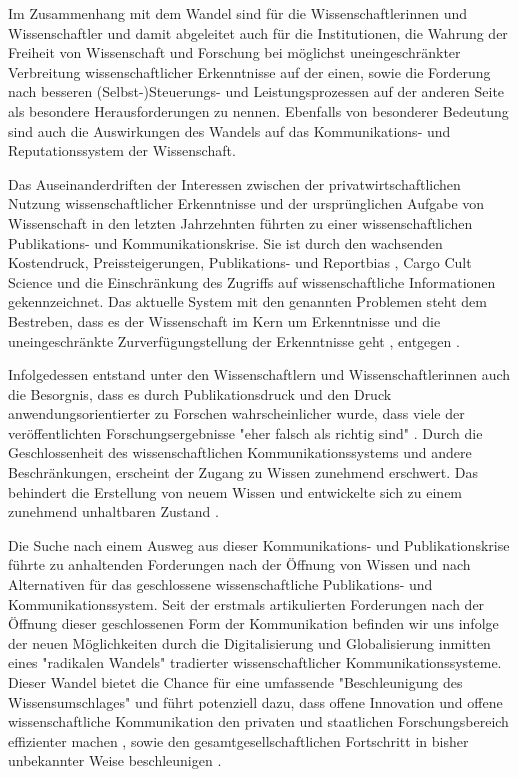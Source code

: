 Im Zusammenhang mit dem Wandel sind für die Wissenschaftlerinnen und Wissenschaftler und damit abgeleitet auch für die Institutionen, die Wahrung der Freiheit von Wissenschaft und Forschung bei möglichst uneingeschränkter Verbreitung wissenschaftlicher Erkenntnisse \cite{hagner_2015_sache_buches} \cite{bbaw_publizieren_2015} auf der einen, sowie die Forderung nach besseren (Selbst-)Steuerungs- und Leistungsprozessen \cite{Adler_2009} \cite{gibbons_1994} auf der anderen Seite als besondere Herausforderungen zu nennen. Ebenfalls von besonderer Bedeutung sind auch die Auswirkungen des Wandels auf das Kommunikations- und Reputationssystem der Wissenschaft.

Das Auseinanderdriften der Interessen zwischen der privatwirtschaftlichen Nutzung wissenschaftlicher Erkenntnisse und der ursprünglichen Aufgabe von Wissenschaft in den letzten Jahrzehnten führten zu einer wissenschaftlichen Publikations- und Kommunikationskrise. Sie ist durch den wachsenden Kostendruck, Preissteigerungen, Publikations- \cite{Egger_1997} \cite{Fanelli_2012} \cite{Beverungen_2012} \cite{Brembs_20013} und Reportbias \cite{Chan_2008} \cite{Dickersin_2011}, Cargo Cult Science \cite{Feynman_1974} und die Einschränkung des Zugriffs auf wissenschaftliche Informationen \cite{Hess_2006} gekennzeichnet. Das aktuelle System mit den genannten Problemen steht dem Bestreben, dass es der Wissenschaft im Kern um Erkenntnisse und die uneingeschränkte Zurverfügungstellung der Erkenntnisse geht \cite{hanekop_2006}, entgegen \cite{offhaus_2012_institutionelle_repos}.

Infolgedessen entstand unter den Wissenschaftlern und Wissenschaftlerinnen auch die Besorgnis, dass es durch Publikationsdruck und den Druck anwendungsorientierter zu Forschen wahrscheinlicher wurde, dass viele der veröffentlichten Forschungsergebnisse "eher falsch als richtig sind" \cite{Ioannidis_2005}. Durch die Geschlossenheit des wissenschaftlichen Kommunikationssystems und andere Beschränkungen, erscheint der Zugang zu Wissen zunehmend erschwert. Das behindert die Erstellung von neuem Wissen \cite{cite:5} \cite{cite:8} \cite{Luhmann1998} und entwickelte sich zu einem zunehmend unhaltbaren Zustand \cite{Schekman_2013}.

Die Suche nach einem Ausweg aus dieser Kommunikations- und Publikationskrise führte zu anhaltenden Forderungen nach der Öffnung von Wissen und nach Alternativen für das geschlossene wissenschaftliche Publikations- und Kommunikationssystem. Seit der erstmals artikulierten Forderungen nach der Öffnung dieser geschlossenen Form der Kommunikation befinden wir uns infolge der neuen Möglichkeiten durch die Digitalisierung und Globalisierung \cite{mcluhan_1962_gutenberg} inmitten eines "radikalen Wandels" \cite{poynder_2011_suber} tradierter wissenschaftlicher Kommunikationssysteme. Dieser Wandel bietet die Chance für eine umfassende "Beschleunigung des Wissensumschlages" \cite{Wenzel_2003} und führt potenziell dazu, dass offene Innovation und offene wissenschaftliche Kommunikation den privaten und staatlichen Forschungsbereich effizienter machen \cite{chesbrough_2006_open}, sowie den gesamtgesellschaftlichen Fortschritt in bisher unbekannter Weise beschleunigen \cite{cite:7}.

